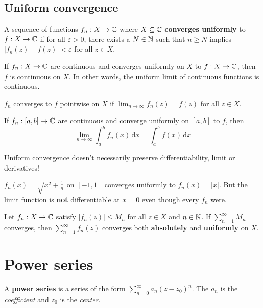 \documentclass[12pt]{article}
\begin{document}
\subsection{Uniform convergence}
 A sequence of functions $f_n: X\to \mathbb{C}$ where $X\subseteq \mathbb{C}$ \textbf{converges uniformly} to $f:X\to \mathbb{C}$ if for all $\varepsilon>0$, there exists a $N\in \mathbb{N}$ such that $n\geq N$ implies $|f_n(z)-f(z)|<\varepsilon$ for all $z\in X$.

\begin{theorem}
    If $f_n: X\to \mathbb{C}$ are continuous and converges uniformly on $X$ to $f:X\to\mathbb{C}$, then $f$ is continuous on $X$.
    In other words, the uniform limit of continuous functions is continuous.
\end{theorem}

\rmk $f_n$ converges to $f$ pointwise on $X$ if $\lim_{n\to \infty}f_n(z)=f(z)$ for all $z\in X$.

\begin{theorem}
    If $f_n:[a,b]\to \mathbb{C}$ are continuous and converge uniformly on $[a,b]$ to $f$, then $$
    \lim_{n\to \infty}\int_{a}^{b}f_n(x)\,\mathrm{d}x = \int_{a}^{b}f(x)\,\mathrm{d}x
    $$
\end{theorem}

\rmk Uniform convergence doesn't necessarily preserve differentiability, limit or derivatives!

\eg $f_n(x)=\sqrt{x^2+\frac{1}{n}}$ on $[-1,1]$ converges uniformly to $f_n(x)=|x|$. But the limit function is \textbf{not} differentiable at $x=0$ even though every $f_n$ were.

\begin{theorem} 
    Let $f_n:X\to \mathbb{C}$ satisfy $|f_n(z)|\leq M_n$ for all $z\in X$ and $n\in \mathbb{N}$. If $\sum_{n=1}^{\infty}M_n$ converges, then $\sum_{n=1}^{\infty}f_n(z)$ converges both \textbf{absolutely} and \textbf{uniformly} on $X$.
\end{theorem}

\section{Power series}
 A \textbf{power series} is a series of the form $\sum_{n=0}^{\infty}a_n(z-z_0)^n$. The $a_n$ is the \textit{coefficient} and $z_0$ is the \textit{center}.
\end{document}
